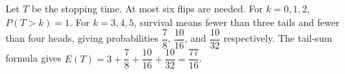 Let $T$ be the stopping time. At most six flips are needed. For $k=0,1,2$, $P(T>k)=1$. For $k=3,4,5$, survival means fewer than three tails and fewer than four heads, giving probabilities $\dfrac{7}{8}$, $\dfrac{10}{16}$, and $\dfrac{10}{32}$ respectively. The tail-sum formula gives $E(T)=3+\dfrac{7}{8}+\dfrac{10}{16}+\dfrac{10}{32}=\boxed{\dfrac{77}{16}}$.
